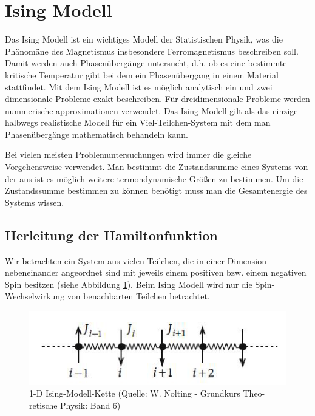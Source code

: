 
\usepackage{amsmath} 





\section*{Ising Modell}

Das Ising Modell ist ein wichtiges Modell der Statistischen Physik, was die Phänomäne des Magnetismus insbesondere Ferromagnetismus beschreiben soll. Damit werden auch Phasenübergänge untersucht, d.h. ob es eine bestimmte kritische Temperatur gibt bei dem ein Phasenübergang in einem Material stattfindet. Mit dem Ising Modell ist es möglich analytisch ein und zwei dimensionale Probleme exakt beschreiben. Für dreidimensionale Probleme werden nummerische approximationen verwendet. Das Ising Modell gilt als das einzige halbwegs realistische Modell für ein Viel-Teilchen-System mit dem man Phasenübergänge mathematisch behandeln kann.

Bei vielen meisten Problemuntersuchungen wird immer die gleiche Vorgehensweise verwendet. Man bestimmt die Zustandssumme eines Systems von der aus ist es möglich weitere termondynamische Größen zu bestimmen. Um die Zustandssumme bestimmen zu können benötigt muss man die Gesamtenergie des Systems wissen.

\subsection*{Herleitung der Hamiltonfunktion}

Wir betrachten ein System aus vielen Teilchen, die in einer Dimension nebeneinander angeordnet sind mit jeweils einem positiven bzw. einem negativen Spin besitzen (siehe Abbildung \ref{fig:1}). Beim Ising Modell wird nur die Spin-Wechselwirkung von benachbarten Teilchen betrachtet.


\begin{figure}
  \centering
  \includegraphics[scale=0.5]{./ising-pics/ising01.png}
  \caption{1-D Ising-Modell-Kette (Quelle: W. Nolting - Grundkurs Theo-
retische Physik: Band 6)
}
  \label{fig:1}
\end{figure}


